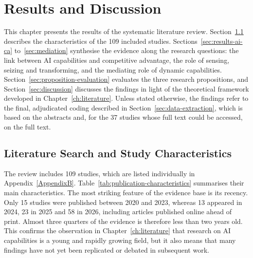 
\chapter{Results and Discussion}
\label{ch:results}

This chapter presents the results of the systematic literature review. Section~\ref{sec:study-characteristics} describes the characteristics of the 109 included studies. Sections~\ref{sec:results-ai-ca} to~\ref{sec:mediation} synthesise the evidence along the research questions: the link between AI capabilities and competitive advantage, the role of sensing, seizing and transforming, and the mediating role of dynamic capabilities. Section~\ref{sec:proposition-evaluation} evaluates the three research propositions, and Section~\ref{sec:discussion} discusses the findings in light of the theoretical framework developed in Chapter~\ref{ch:literature}. Unless stated otherwise, the findings refer to the final, adjudicated coding described in Section~\ref{sec:data-extraction}, which is based on the abstracts and, for the 37 studies whose full text could be accessed, on the full text.

\section{Literature Search and Study Characteristics}
\label{sec:study-characteristics}

The review includes 109 studies, which are listed individually in Appendix~\ref{AppendixB}. Table~\ref{tab:publication-characteristics} summarises their main characteristics. The most striking feature of the evidence base is its recency. Only 15 studies were published between 2020 and 2023, whereas 13 appeared in 2024, 23 in 2025 and 58 in 2026, including articles published online ahead of print. Almost three quarters of the evidence is therefore less than two years old. This confirms the observation in Chapter~\ref{ch:literature} that research on AI capabilities is a young and rapidly growing field, but it also means that many findings have not yet been replicated or debated in subsequent work.

